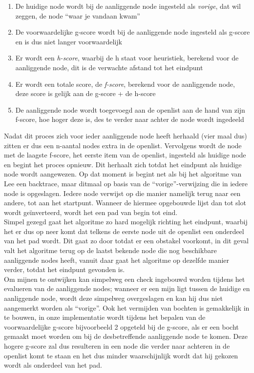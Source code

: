 \documentclass{report}
\begin{document}
\begin{enumerate}
	\item De huidige node wordt bij de aanliggende node ingesteld als \textit{vorige}, dat wil zeggen, de node ``waar je vandaan kwam''
	\item De voorwaardelijke g-score wordt bij de aanliggende node ingesteld als g-score en is dus niet langer voorwaardelijk
	\item Er wordt een \textit{h-score}, waarbij de h staat voor heuristiek, berekend voor de aanliggende node, dit is de verwachte afstand tot het eindpunt
	\item Er wordt een totale score, de \textit{f-score}, berekend voor de aanliggende node, deze score is gelijk aan de g-score + de h-score
	\item De aanliggende node wordt toegevoegd aan de openlist aan de hand van zijn f-score, hoe hoger deze is, des te verder naar achter de node wordt ingedeeld
\end{enumerate}

\noindent
Nadat dit proces zich voor ieder aanliggende node heeft herhaald (vier maal dus) zitten er dus een n-aantal nodes extra in de openlist. Vervolgens wordt de node met de laagste f-score, het eerste item van de openlist, ingesteld als huidige node en begint het proces opnieuw. Dit herhaalt zich totdat het eindpunt als huidige node wordt aangewezen. Op dat moment is begint net als bij het algoritme van Lee een backtrace, maar ditmaal op basis van de ``vorige''-verwijzing die in iedere node is opgeslagen. Iedere node verwijst op die manier namelijk terug naar een andere, tot aan het startpunt. Wanneer de hiermee opgebouwde lijst dan tot slot wordt geïnverteerd, wordt het een pad van begin tot eind.
\\

\noindent
Simpel gezegd gaat het algoritme zo hard mogelijk richting het eindpunt, waarbij het er dus op neer komt dat telkens de eerste node uit de openlist een onderdeel van het pad wordt. Dit gaat zo door totdat er een obstakel voorkomt, in dit geval valt het algoritme terug op de laatst bekende node die nog beschikbare aanliggende nodes heeft, vanuit daar gaat het algoritme op dezelfde manier verder, totdat het eindpunt gevonden is.
\\

\noindent
Om mijnen te ontwijken kan simpelweg een check ingebouwd worden tijdens het evalueren van de aanliggende nodes; wanneer er een mijn ligt tussen de huidige en aanliggende node, wordt deze simpelweg overgeslagen en kan hij dus niet aangemerkt worden als ``vorige''.
Ook het vermijden van bochten is gemakkelijk in te bouwen, in onze implementatie wordt tijdens het bepalen van de voorwaardelijke g-score bijvoorbeeld 2 opgeteld bij de g-score, als er een bocht gemaakt moet worden om bij de desbetreffende aanliggende node te komen. Deze hogere g-score zal dus resulteren in een node die verder naar achteren in de openlist komt te staan en het dus minder waarschijnlijk wordt dat hij gekozen wordt als onderdeel van het pad.
\\
\end{document}
